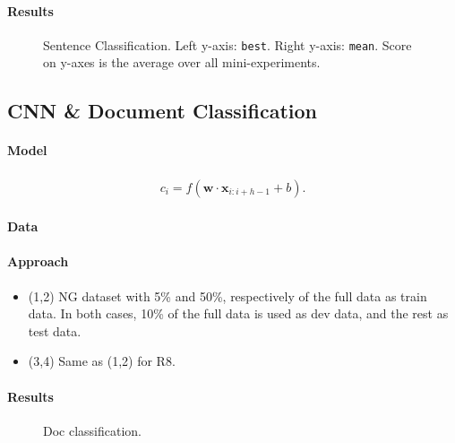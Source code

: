 \documentclass[11pt,a4paper]{article}
\newcommand{\best}{\texttt{best}}
\newcommand{\avg}{\texttt{mean}}
\begin{document}
\paragraph{Results}

\begin{figure}[htb]
  \centering
  \scalebox{0.5}{}
  \caption{Sentence Classification. Left y-axis: \best. Right y-axis: \avg{}. Score on y-axes is the average over all mini-experiments.}
  \label{fig:sent}
\end{figure}

\subsection{CNN \& Document Classification}

\paragraph{Model}

\begin{align*}
  c_i = f(\mathbf{w}\cdot \mathbf{x}_{i:i+h-1}+b).
\end{align*}

\paragraph{Data}

\paragraph{Approach}

\begin{itemize}[noitemsep,leftmargin=0.6cm]
\item (1,2) NG dataset with 5\% and 50\%, respectively of the full data as train data. In both cases, 10\% of the full data is used as dev data, and the rest as test data.
\item (3,4) Same as (1,2) for R8.
\end{itemize}

\paragraph{Results}

\begin{figure}[!htb]
\centering
\scalebox{0.5}{}
\caption{Doc classification.}
\label{fig:doc}
\end{figure}
\end{document}
